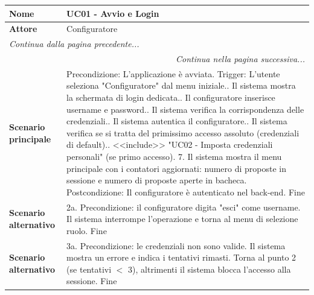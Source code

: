 \documentclass[12pt, a4paper, oneside]{report}
\begin{document}
\begin{tabularx}{\textwidth}{|l|X|}
    \hline
    \textbf{Nome}               & \textbf{UC01 - Avvio e Login} \\ \hline
    \textbf{Attore}             & Configuratore \\ \hline
    \endfirsthead 

    \hline
    \multicolumn{2}{|l|}{\textit{Continua dalla pagina precedente...}} \\ \hline
    \endhead 

    \hline
    \multicolumn{2}{|r|}{\textit{Continua nella pagina successiva...}} \\ \hline
    \endfoot 

    \hline
    \endlastfoot

    \textbf{Scenario principale} & 
    Precondizione: L'applicazione è avviata. \newline
    Trigger: L'utente seleziona "Configuratore" dal menu iniziale.\newline
    1. Il sistema mostra la schermata di login dedicata.\newline
    2. Il configuratore inserisce username e password.\newline
    3. Il sistema verifica la corrispondenza delle credenziali.\newline
    4. Il sistema autentica il configuratore.\newline
    5. Il sistema verifica se si tratta del primissimo accesso assoluto (credenziali di default).\newline
    6. <<include>> "UC02 - Imposta credenziali personali" (se primo accesso).\newline
    \textcolor{BurntOrange}{7. Il sistema mostra il menu principale con i contatori aggiornati: numero di proposte in sessione e numero di proposte aperte in bacheca.}\newline
    Postcondizione: Il configuratore è autenticato nel back-end. \newline
    Fine \\ \hline
    
    \textbf{Scenario alternativo} & 
    2a. Precondizione: il configuratore digita "esci" come username.\newline
    Il sistema interrompe l'operazione e torna al menu di selezione ruolo. \newline
    Fine \\ \hline

    \textbf{Scenario alternativo} & 
    3a. Precondizione: le credenziali non sono valide. \newline
    Il sistema mostra un errore e indica i tentativi rimasti. Torna al punto 2 (se tentativi $<$ 3), altrimenti il sistema blocca l'accesso alla sessione. \newline
    Fine \\ \hline


\end{tabularx}
\end{document}
